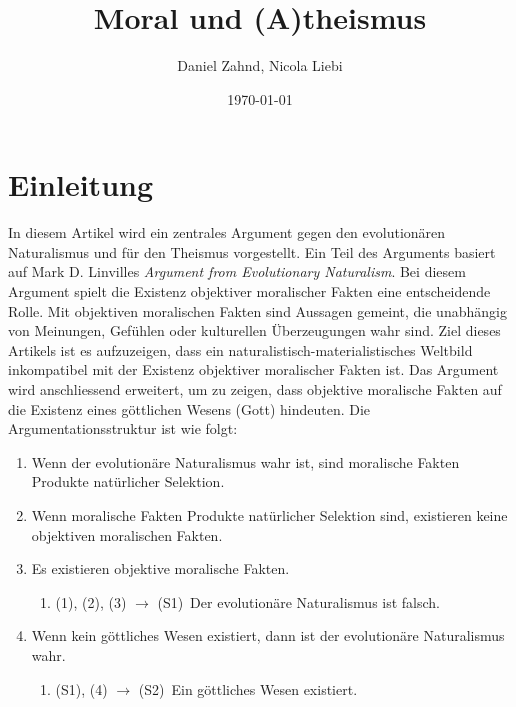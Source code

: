 \documentclass[11pt,a4paper]{article}
\title{Moral und (A)theismus}
\author{Daniel Zahnd, Nicola Liebi}
\date{\today}
\begin{document}
	\maketitle
	
	\section{Einleitung}
	
	In diesem Artikel wird ein zentrales Argument gegen den evolutionären Naturalismus und für den Theismus vorgestellt. Ein Teil des Arguments basiert auf Mark D. Linvilles \textit{Argument from Evolutionary Naturalism}. Bei diesem Argument spielt die Existenz objektiver moralischer Fakten eine entscheidende Rolle. Mit objektiven moralischen Fakten sind Aussagen gemeint, die unabhängig von Meinungen, Gefühlen oder kulturellen Überzeugungen wahr sind. Ziel dieses Artikels ist es aufzuzeigen, dass ein naturalistisch-materialistisches Weltbild inkompatibel mit der Existenz objektiver moralischer Fakten ist. Das Argument wird anschliessend erweitert, um zu zeigen, dass objektive moralische Fakten auf die Existenz eines göttlichen Wesens (Gott) hindeuten. Die Argumentationsstruktur ist wie folgt:
	
	\begin{tcolorbox}[title=Die vier Prämissen des Arguments]
		\begin{enumerate}[label=(\arabic*)]
			\item Wenn der evolutionäre Naturalismus wahr ist, sind moralische Fakten Produkte natürlicher Selektion.
			\item Wenn moralische Fakten Produkte natürlicher Selektion sind, existieren keine objektiven moralischen Fakten.
			\item Es existieren objektive moralische Fakten.
			\begin{enumerate}[label=(\arabic*)]
				\item[] (1), (2), (3) $\rightarrow$ (S1)$\,$ Der evolutionäre Naturalismus ist falsch.
			\end{enumerate}
			\item Wenn kein göttliches Wesen existiert, dann ist der evolutionäre Naturalismus wahr.
			\begin{enumerate}[label=(\arabic*)]
				\item[] (S1), (4) $\rightarrow$ (S2)$\,$ Ein göttliches Wesen existiert.
			\end{enumerate}
		\end{enumerate}
	\end{tcolorbox}
	
\end{document}
